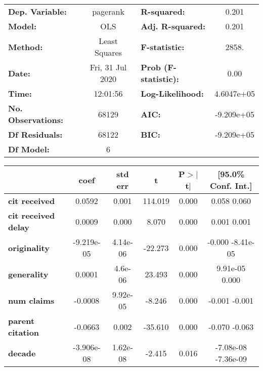 \begin{center}
\begin{tabular}{lclc}
\toprule
\textbf{Dep. Variable:}     &     pagerank     & \textbf{  R-squared:         } &      0.201    \\
\textbf{Model:}             &       OLS        & \textbf{  Adj. R-squared:    } &      0.201    \\
\textbf{Method:}            &  Least Squares   & \textbf{  F-statistic:       } &      2858.    \\
\textbf{Date:}              & Fri, 31 Jul 2020 & \textbf{  Prob (F-statistic):} &      0.00     \\
\textbf{Time:}              &     12:01:56     & \textbf{  Log-Likelihood:    } &  4.6047e+05   \\
\textbf{No. Observations:}  &       68129      & \textbf{  AIC:               } &  -9.209e+05   \\
\textbf{Df Residuals:}      &       68122      & \textbf{  BIC:               } &  -9.209e+05   \\
\textbf{Df Model:}          &           6      & \textbf{                     } &               \\
\bottomrule
\end{tabular}
\begin{tabular}{lccccc}
                            & \textbf{coef} & \textbf{std err} & \textbf{t} & \textbf{P$>$$|$t$|$} & \textbf{[95.0\% Conf. Int.]}  \\
\midrule
\textbf{cit received}       &       0.0592  &        0.001     &   114.019  &         0.000        &         0.058     0.060       \\
\textbf{cit received delay} &       0.0009  &        0.000     &     8.070  &         0.000        &         0.001     0.001       \\
\textbf{originality}        &   -9.219e-05  &     4.14e-06     &   -22.273  &         0.000        &        -0.000 -8.41e-05       \\
\textbf{generality}         &       0.0001  &      4.6e-06     &    23.493  &         0.000        &      9.91e-05     0.000       \\
\textbf{num claims}         &      -0.0008  &     9.92e-05     &    -8.246  &         0.000        &        -0.001    -0.001       \\
\textbf{parent citation}    &      -0.0663  &        0.002     &   -35.610  &         0.000        &        -0.070    -0.063       \\
\textbf{decade}             &   -3.906e-08  &     1.62e-08     &    -2.415  &         0.016        &     -7.08e-08 -7.36e-09       \\

\end{tabular}
\end{center}
